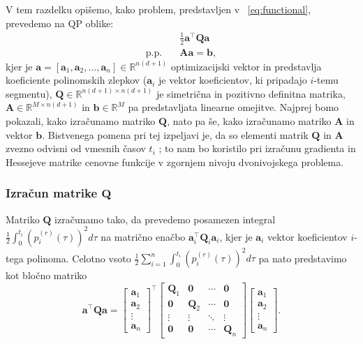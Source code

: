 \documentclass[isrm2, tisk]{fmfdelo}
\newcommand{\avec}{\mathbf{a}}
\begin{document}
V tem razdelku opišemo, kako problem, predstavljen v ~\eqref{eq:functional}, prevedemo na \ac{QP} oblike:
\begin{equation}
    \begin{aligned}
        &\frac{1}{2}\mathbf{a}^\top \mathbf{Q} \mathbf{a}\\
        \text{p.p.}\quad & \mathbf{A}\mathbf{a} = \mathbf{b},
    \end{aligned}
\end{equation}
kjer je $\mathbf{a} = [\avec_1, \avec_2, \ldots, \avec_n] \in \mathbb{R}^{n (d+1)}$ optimizacijski vektor in predstavlja koeficiente polinomskih zlepkov ($\avec_i$ je vektor koeficientov, ki pripadajo $i$-temu segmentu), $\mathbf{Q} \in \mathbb{R}^{n(d+1) \times n(d+1)}$ je simetrična in pozitivno definitna matrika, $\mathbf{A} \in \mathbb{R}^{M \times n(d+1)}$ in $\mathbf{b} \in \mathbb{R}^M$ pa predstavljata linearne omejitve. Najprej bomo pokazali, kako izračunamo matriko $\mathbf{Q}$, nato pa še, kako izračunamo matriko $\mathbf{A}$ in vektor $\mathbf{b}$. Bistvenega pomena pri tej izpeljavi je, da so elementi matrik $\mathbf{Q}$ in $\mathbf{A}$ zvezno odvisni od vmesnih časov $t_i$ \cite{carlone2020vnav}; to nam bo koristilo pri izračunu gradienta in Hessejeve matrike cenovne funkcije v zgornjem nivoju dvonivojskega problema.

\subsubsection{Izračun matrike $\mathbf{Q}$}
Matriko $\mathbf{Q}$ izračunamo tako, da prevedemo posamezen integral $\frac{1}{2}\int_0^{t_i} (p_i^{(r)}(\tau))^2 d\tau$ na matrično enačbo $\mathbf{a}_i^\top \mathbf{Q}_i \mathbf{a}_i$, kjer je $\mathbf{a}_i$ vektor koeficientov $i$-tega polinoma. Celotno vsoto $\frac{1}{2}\sum_{i=1}^n \int_0^{t_i} (p_i^{(r)}(\tau))^2 d\tau$ pa nato predstavimo kot bločno matriko
\begin{equation}
\label{eq:cost_function_matrix}
    \mathbf{a}^\top \mathbf{Q} \mathbf{a} = 
    \begin{bmatrix}
        \mathbf{a}_1 \\ \mathbf{a}_2 \\ \vdots \\ \mathbf{a}_n 
    \end{bmatrix}^\top
    \begin{bmatrix}
        \mathbf{Q}_1 & \mathbf{0} & \cdots & \mathbf{0} \\
        \mathbf{0} & \mathbf{Q}_2 & \cdots & \mathbf{0} \\
        \vdots & \vdots & \ddots & \vdots \\
        \mathbf{0} & \mathbf{0} & \cdots & \mathbf{Q}_n
    \end{bmatrix}
    \begin{bmatrix}
        \mathbf{a}_1 \\ \mathbf{a}_2 \\ \vdots \\ \mathbf{a}_n 
    \end{bmatrix}.
\end{equation}
\end{document}
